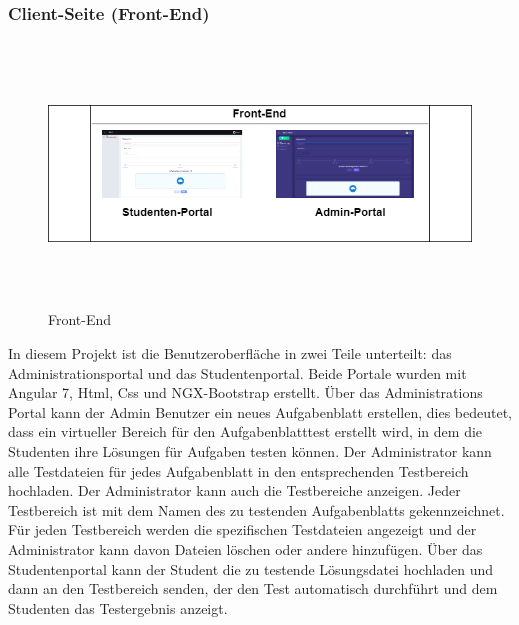 \documentclass[apaper4,12p]{scrartcl}
\begin{document}
\subsubsection{Client-Seite (Front-End)}
\begin{figure}[h!]
	\begin{center}
		\includegraphics[width=17.5cm, height=7cm]{FrontEnd.png}
		\caption{Front-End } 
		\label{ Front-End } 
	\end{center}
\end{figure}
In diesem Projekt ist die Benutzeroberfläche in zwei Teile unterteilt: das Administrationsportal und das Studentenportal. Beide Portale wurden mit Angular 7, Html, Css und NGX-Bootstrap erstellt.
Über das Administrations Portal kann der Admin Benutzer ein neues Aufgabenblatt erstellen, dies bedeutet, dass ein virtueller Bereich für den Aufgabenblatttest erstellt wird, in dem die Studenten ihre Lösungen für Aufgaben testen können. Der Administrator kann alle Testdateien für jedes Aufgabenblatt in den entsprechenden Testbereich hochladen. Der Administrator kann auch die Testbereiche anzeigen. Jeder Testbereich ist mit dem Namen des zu testenden Aufgabenblatts gekennzeichnet. Für jeden Testbereich werden die spezifischen Testdateien angezeigt und der Administrator kann davon Dateien löschen oder andere hinzufügen.
Über das Studentenportal kann der Student die zu testende Lösungsdatei hochladen und dann an den Testbereich senden, der den Test automatisch durchführt und dem Studenten das Testergebnis anzeigt.
\end{document}
